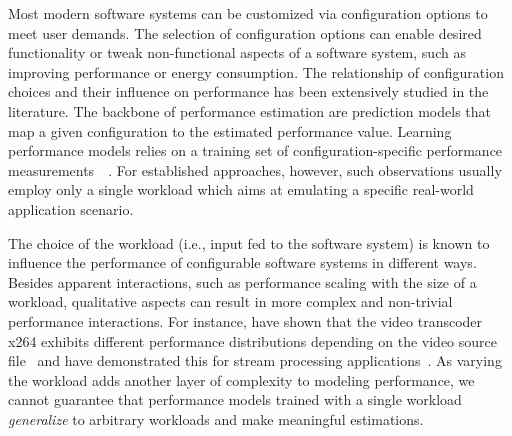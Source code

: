 
Most modern software systems can be customized via configuration options to meet user demands. The selection of configuration options can enable desired functionality or tweak non-functional aspects of a software system, such as improving performance or energy consumption. The relationship of configuration choices and their influence on performance has been extensively studied in the literature. The backbone of performance estimation are prediction models that map a given configuration to the estimated performance value. Learning performance models relies on a training set of configuration-specific performance measurements~~\cite{dorn2020,siegmundPerformanceinfluenceModelsHighly2015,haDeepPerf2019,perfAL,guoVariabilityawarePerformancePrediction2013,sarkarCostEfficientSamplingPerformance,guo_2018_data,fourier_learning_2015,perLasso}. For established approaches, however, such observations usually employ only a single workload which aims at emulating a specific real-world application scenario.

The choice of the workload (i.e., input fed to the software system) is known to influence the performance of configurable software systems in different ways. Besides apparent interactions, such as performance scaling with the size of a workload, qualitative aspects can result in more complex and non-trivial performance interactions. For instance, \citeauthor{alves_sampling_2020} have shown that the video transcoder \textsf{x264} exhibits different performance distributions depending on the video source file~\cite{alves_sampling_2020} and \citeauthor{liao_2020_using_emse} have demonstrated this for stream processing applications~\cite{liao_2020_using_emse}. As varying the workload adds another layer of complexity to modeling performance, we cannot guarantee that performance models trained with a single workload \textit{generalize} to arbitrary workloads and make meaningful estimations. 

